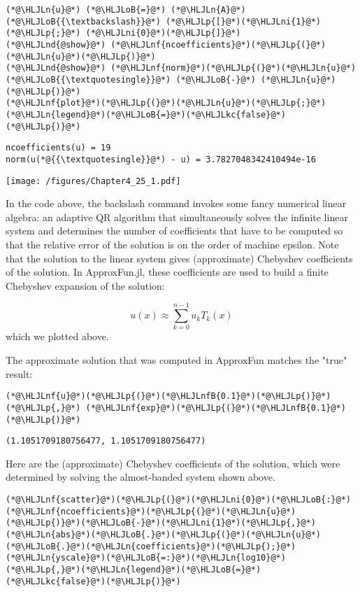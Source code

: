 \documentclass[12pt,a4paper]{article}
\newcommand{\HLJLkc}[1]{\textcolor[RGB]{59,151,46}{\textit{#1}}}
\newcommand{\HLJLn}[1]{#1}
\newcommand{\HLJLnd}[1]{\textcolor[RGB]{214,102,97}{#1}}
\newcommand{\HLJLnf}[1]{\textcolor[RGB]{66,102,213}{#1}}
\newcommand{\HLJLnfB}[1]{\textcolor[RGB]{59,151,46}{#1}}
\newcommand{\HLJLni}[1]{\textcolor[RGB]{59,151,46}{#1}}
\newcommand{\HLJLoB}[1]{\textcolor[RGB]{102,102,102}{\textbf{#1}}}
\newcommand{\HLJLp}[1]{#1}
\begin{document}
\begin{lstlisting}
(*@\HLJLn{u}@*) (*@\HLJLoB{=}@*) (*@\HLJLn{A}@*) (*@\HLJLoB{{\textbackslash}}@*) (*@\HLJLp{[}@*)(*@\HLJLni{1}@*)(*@\HLJLp{;}@*) (*@\HLJLni{0}@*)(*@\HLJLp{]}@*)
(*@\HLJLnd{@show}@*) (*@\HLJLnf{ncoefficients}@*)(*@\HLJLp{(}@*)(*@\HLJLn{u}@*)(*@\HLJLp{)}@*)
(*@\HLJLnd{@show}@*) (*@\HLJLnf{norm}@*)(*@\HLJLp{(}@*)(*@\HLJLn{u}@*)(*@\HLJLoB{{\textquotesingle}}@*) (*@\HLJLoB{-}@*) (*@\HLJLn{u}@*)(*@\HLJLp{)}@*)
(*@\HLJLnf{plot}@*)(*@\HLJLp{(}@*)(*@\HLJLn{u}@*)(*@\HLJLp{;}@*)(*@\HLJLn{legend}@*)(*@\HLJLoB{=}@*)(*@\HLJLkc{false}@*)(*@\HLJLp{)}@*)
\end{lstlisting}

\begin{lstlisting}
ncoefficients(u) = 19
norm(u(*@{{\textquotesingle}}@*) - u) = 3.7827048342410494e-16
\end{lstlisting}

\texttt{[image: /figures/Chapter4\_25\_1.pdf]}

In the code above, the backslash command invokes some fancy numerical linear algebra: an adaptive QR algorithm that simultaneously solves the infinite linear system and determines the number of coefficients that have to be computed so that the relative error of the solution is on the order of machine epsilon.  Note that the solution to the linear system gives (approximate) Chebyshev coefficients of the solution.  In ApproxFun.jl, these coefficients are used to build a finite Chebyshev expansion of the solution:

\[
u(x) \approx \sum_{k = 0}^{n-1}u_kT_k(x)
\]
which we plotted above.

The approximate solution that was computed in ApproxFun matches the "true" result:


\begin{lstlisting}
(*@\HLJLnf{u}@*)(*@\HLJLp{(}@*)(*@\HLJLnfB{0.1}@*)(*@\HLJLp{)}@*) (*@\HLJLp{,}@*) (*@\HLJLnf{exp}@*)(*@\HLJLp{(}@*)(*@\HLJLnfB{0.1}@*)(*@\HLJLp{)}@*)
\end{lstlisting}

\begin{lstlisting}
(1.1051709180756477, 1.1051709180756477)
\end{lstlisting}


Here are the (approximate) Chebyshev coefficients of the solution, which were determined by solving the almost-banded system shown above.


\begin{lstlisting}
(*@\HLJLnf{scatter}@*)(*@\HLJLp{(}@*)(*@\HLJLni{0}@*)(*@\HLJLoB{:}@*)(*@\HLJLnf{ncoefficients}@*)(*@\HLJLp{(}@*)(*@\HLJLn{u}@*)(*@\HLJLp{)}@*)(*@\HLJLoB{-}@*)(*@\HLJLni{1}@*)(*@\HLJLp{,}@*)(*@\HLJLn{abs}@*)(*@\HLJLoB{.}@*)(*@\HLJLp{(}@*)(*@\HLJLn{u}@*)(*@\HLJLoB{.}@*)(*@\HLJLn{coefficients}@*)(*@\HLJLp{);}@*)(*@\HLJLn{yscale}@*)(*@\HLJLoB{=:}@*)(*@\HLJLn{log10}@*)(*@\HLJLp{,}@*)(*@\HLJLn{legend}@*)(*@\HLJLoB{=}@*)(*@\HLJLkc{false}@*)(*@\HLJLp{)}@*)
\end{lstlisting}
\end{document}
